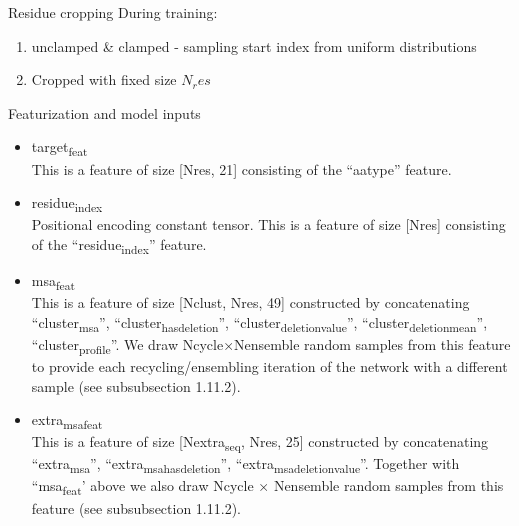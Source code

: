 \documentclass[presentation, smaller]{beamer}
\begin{document}
\begin{frame}[label={sec:org59c181a}]{Residue cropping \cite{jumperHighlyAccurateProtein2021}}
During training:
\begin{enumerate}
\item unclamped \& clamped - sampling start index from uniform distributions
\item Cropped with fixed size \(N_res\)
\end{enumerate}
\end{frame}

\begin{frame}[label={sec:orge5aa2ae}]{Featurization and model inputs \cite{jumperHighlyAccurateProtein2021}}
\begin{itemize}
\item \alert{target\textsubscript{feat}} \\
This is a feature of size [Nres, 21] consisting of the “aatype” feature.
\item \alert{residue\textsubscript{index}} \\
Positional encoding constant tensor. This is a feature of size [Nres] consisting of the “residue\textsubscript{index}” feature.
\item \alert{msa\textsubscript{feat}} \\
This is a feature of size [Nclust, Nres, 49] constructed by concatenating “cluster\textsubscript{msa}”, “cluster\textsubscript{has}\textsubscript{deletion}”, “cluster\textsubscript{deletion}\textsubscript{value}”, “cluster\textsubscript{deletion}\textsubscript{mean}”, “cluster\textsubscript{profile}”. We draw Ncycle×Nensemble random samples from this feature to provide each recycling/ensembling iteration of the network with a different sample (see subsubsection 1.11.2).
\item \alert{extra\textsubscript{msa}\textsubscript{feat}} \\
This is a feature of size [Nextra\textsubscript{seq}, Nres, 25] constructed by concatenating “extra\textsubscript{msa}”, “extra\textsubscript{msa}\textsubscript{has}\textsubscript{deletion}”, “extra\textsubscript{msa}\textsubscript{deletion}\textsubscript{value}”. Together with “msa\textsubscript{feat}’ above we also draw Ncycle × Nensemble random samples from this feature (see subsubsection 1.11.2).
\end{itemize}
\end{frame}
\end{document}
